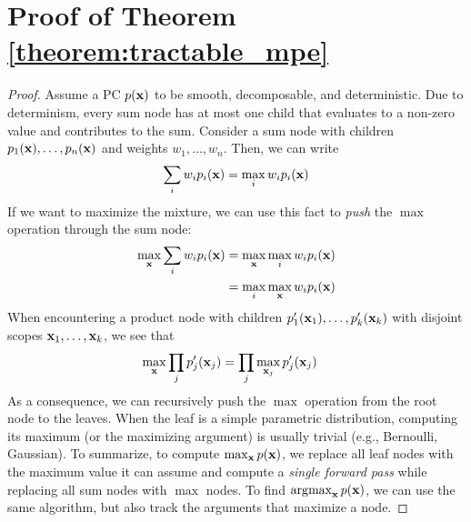 \section{Proof of Theorem \ref{theorem:tractable_mpe}}
\label{app:tractable_mpe_proof}
\begin{proof}
    Assume a PC $p(\mathbf{x})$ to be smooth, decomposable, and deterministic. Due to determinism, every sum node has at most one child that evaluates to a non-zero value and contributes to the sum. Consider a sum node with children $p_1(\mathbf{x}),\dots,p_n(\mathbf{x})$ and weights $w_1,\dots,w_n$. Then, we can write
    \begin{equation}
        \sum_{i} w_i p_i(\mathbf{x}) = \max_{i} w_i p_i(\mathbf{x})
    \end{equation}
    If we want to maximize the mixture, we can use this fact to \textit{push} the $\max$ operation through the sum node:
    \begin{align}
        \max_{\mathbf{x}} \sum_{i} w_i p_i(\mathbf{x}) &= \max_{\mathbf{x}} \max_{i} w_i p_i(\mathbf{x}) \\
                                         &= \max_{i} \max_{\mathbf{x}} w_i p_i(\mathbf{x})
    \end{align}
    When encountering a product node with children $p'_1(\mathbf{x}_1),\dots,p'_k(\mathbf{x}_k)$ with disjoint scopes $\mathbf{x}_1,\dots,\mathbf{x}_k$, we see that
    \begin{align}
        \max_{\mathbf{x}} \prod_{j} p'_j(\mathbf{x}_j) &= \prod_{j} \max_{\mathbf{x}_j} p'_j(\mathbf{x}_j)
    \end{align}
    As a consequence, we can recursively push the $\max$ operation from the root node to the leaves. When the leaf is a simple parametric distribution, computing its maximum (or the maximizing argument) is usually trivial (e.g., Bernoulli, Gaussian).
    To summarize, to compute $\max_{\mathbf{x}} p(\mathbf{x})$, we replace all leaf nodes with the maximum value it can assume and compute a \textit{single forward pass} while replacing all sum nodes with $\max$ nodes. To find $\operatorname*{\arg\!\max}_{\mathbf{x}} p(\mathbf{x})$, we can use the same algorithm, but also track the arguments that maximize a node.
\end{proof}

